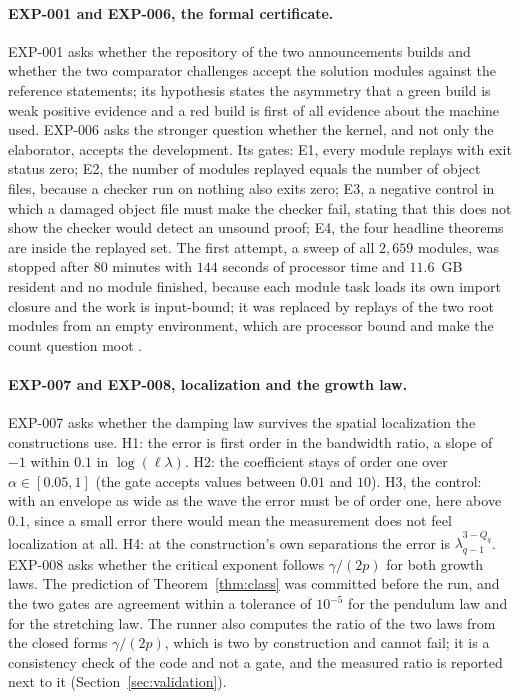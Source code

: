 \documentclass[11pt]{article}
\theoremstyle{remark}
\newcommand{\ev}[1]{\hspace{0.2em}{\small\textsf{[#1]}}}
\begin{document}
\paragraph{EXP-001 and EXP-006, the formal certificate.} EXP-001 asks whether the repository of the two
announcements builds and whether the two comparator challenges accept the solution modules against the
reference statements; its hypothesis states the asymmetry that a green build is weak positive evidence and a red build is first of all evidence about
the machine used. EXP-006 asks the stronger question whether the kernel, and not only the elaborator, accepts
the development. Its gates: E1, every module replays with exit status zero; E2, the number of modules replayed
equals the number of object files, because a checker run on nothing also exits zero; E3, a negative control in
which a damaged object file must make the checker fail, stating that this does not show the
checker would detect an unsound proof; E4, the four headline theorems are inside the replayed set. The first
attempt, a sweep of all $2{,}659$ modules, was stopped after $80$ minutes with $144$ seconds of processor time and
$11.6$~GB resident and no module finished, because each module task loads its own import closure and the work is
input-bound; it was replaced by replays of the two root modules from an empty environment, which are processor
bound and make the count question moot \ev{V}.

\paragraph{EXP-007 and EXP-008, localization and the growth law.} EXP-007 asks whether the damping law
survives the spatial localization the constructions use. H1: the error is first order in the bandwidth ratio,
a slope of $-1$ within $0.1$ in $\log(\ell\lambda)$. H2: the coefficient stays of order one over
$\alpha\in[0.05,1]$ (the gate accepts values between $0.01$ and $10$). H3, the control: with an envelope as wide
as the wave the error must be of order one, here above $0.1$, since a small error there would mean the
measurement does not feel localization at all. H4: at the construction's own separations the error is
$\lambda_{q-1}^{3-Q_{q}}$. EXP-008 asks whether the critical exponent follows $\gamma/(2p)$ for both growth
laws. The prediction of Theorem~\ref{thm:class} was committed before the run, and the
two gates are agreement within a tolerance of $10^{-5}$ for the pendulum law and for the stretching law. The runner
also computes the ratio of the two laws from the closed forms $\gamma/(2p)$, which is two by construction and cannot
fail; it is a consistency check of the code and not a gate, and the measured ratio is reported next to it
(Section~\ref{sec:validation}).
\end{document}
